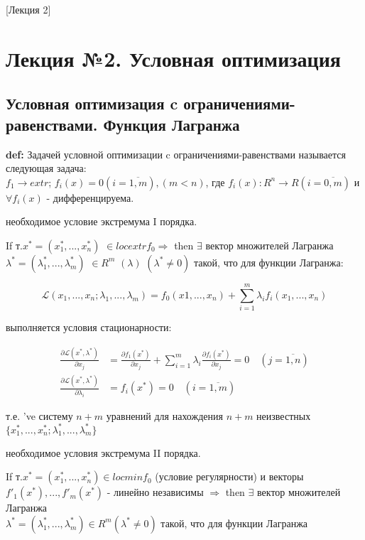 [Лекция 2]

\newpage

\section{Лекция №2. Условная оптимизация}
\subsection{Условная оптимизация c ограничениями-равенствами. Функция Лагранжа}

\textbf{def:} Задачей условной оптимизации c ограничениями-равенствами называется следующая задача: \\ 
$f_1 \rightarrow extr$; $f_i(x)=0(i = \overline{1,m}),(m<n)$, где $f_i(x): R^n \rightarrow R(i = \overline{0,m})$ и $\forall f_i(x)$ - дифференцируема. \\

\begin{theorem}
необходимое условие экстремума I порядка.
\end{theorem}

If т.$x^* = (x^*_1,...,x^*_n)$ $\in locextr f_0 \Rightarrow$ then $\exists$ вектор множителей Лагранжа
$\lambda^* = (\lambda^*_1,...,\lambda^*_m)$ $\in R^m$ $(\lambda)$ $(\lambda^*\neq0)$ такой, что для функции Лагранжа:

\begin{equation}
\mathcal{L}(x_1,...,x_n;\lambda_1,...,\lambda_m) = f_0(x1,...,x_n) + \sum_{i=1}^{m} \lambda_i f_i(x_1,...,x_n)
\end{equation}

выполняется условия стационарности:

\begin{equation}
\begin{aligned}
\frac{\partial \mathcal{L}(x^*,\lambda^*)}{\partial x_j} &= \frac{\partial f_1(x^*)}{\partial x_j} + \sum_{i=1}^{m}\lambda_i \frac{\partial f_i(x^*)}{\partial x_j} = 0 \quad (j = \overline{1,n})
\\
\frac{\partial \mathcal{L}(x^*, \lambda^*)}{\partial \lambda_i} &= f_i(x^*) = 0 \quad (i = \overline{1,m})
\end{aligned}
\end{equation}

т.е. 've систему $n+m$ уравнений для нахождения $n+m$ неизвестных $\{x_1^*,...,x_n^*;\lambda_1^*,...,\lambda_m^*\}$ \\

\begin{theorem}
необходимое условия экстремума II порядка.
\end{theorem}
If т.$x^* = (x_1^*,...,x_n^*) \in locmin f_0$ (условие регулярности) и векторы $f'_1(x^*),...,f'_m(x^*)$ - линейно независимы $\Rightarrow$ then $\exists$ вектор множителей Лагранжа \\
$\lambda^* = (\lambda_1^*,..., \lambda_m^*) \in R^m (\lambda^* \neq 0)$ такой, что для функции Лагранжа 


